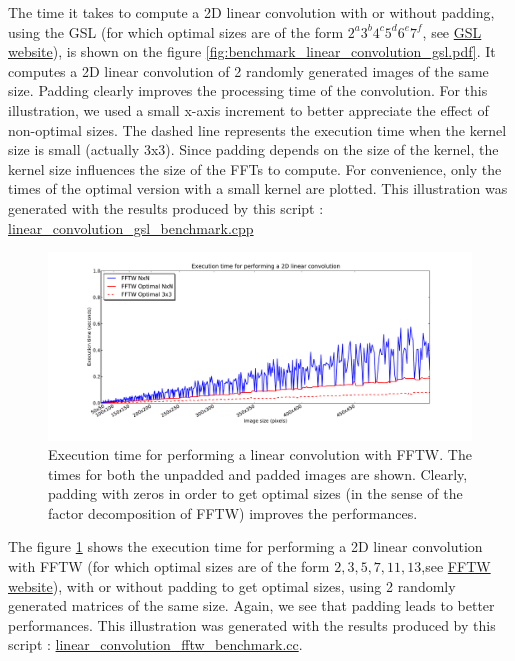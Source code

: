 \documentclass[a4paper,10pt,twoside]{article}
\begin{document}
The time it takes to compute a 2D linear convolution with or without padding, using the GSL (for which optimal sizes are of the form $2^a3^b4^c5^d6^e7^f$, see \href{http://www.gnu.org/software/gsl/manual/html_node/Mixed_002dradix-FFT-routines-for-complex-data.html}{GSL website}), is shown on the figure \ref{fig:benchmark_linear_convolution_gsl.pdf}. It computes a 2D linear convolution of 2 randomly generated images of the same size. Padding clearly improves the processing time of the convolution. For this illustration, we used a small x-axis increment to better appreciate the effect of non-optimal sizes. The dashed line represents the execution time when the kernel size is small (actually 3x3). Since padding depends on the size of the kernel, the kernel size influences the size of the FFTs to compute. For convenience, only the times of the optimal version with a small kernel are plotted. This illustration was generated with the results produced by this script : \href{http://jeremy.fix.free.fr/Software/Convolution/linear_convolution_gsl_benchmark.cc}{linear\_convolution\_gsl\_benchmark.cpp}\\

\begin{figure}[htbp]
\center \includegraphics[width=0.85\linewidth]{Images/benchmark_linear_convolution_fftw.pdf}
\caption{\label{fig:benchmark_linear_convolution_fftw.pdf}Execution time for performing a linear convolution with FFTW. The times for both the unpadded and padded images are shown. Clearly, padding with zeros in order to get optimal sizes (in the sense of the factor decomposition of FFTW) improves the performances.}
\end{figure}

The figure \ref{fig:benchmark_linear_convolution_fftw.pdf} shows the execution time for performing a 2D linear convolution with FFTW (for which optimal sizes are of the form $2,3,5,7,11,13$,see \href{http://www.fftw.org/fftw3_doc/Complex-DFTs.html#Complex-DFTs}{FFTW website}), with or without padding to get optimal sizes, using 2 randomly generated matrices of the same size. Again, we see that padding leads to better performances. This illustration was generated with the results produced by this script : \href{http://jeremy.fix.free.fr/Software/Convolution/linear_convolution_fftw_benchmark.cpp}{linear\_convolution\_fftw\_benchmark.cc}.\\
\end{document}
